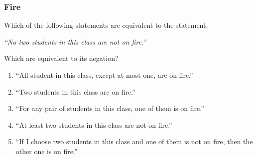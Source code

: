 \documentclass[14pt]{beamer}
\newcommand{\setsize}[1]{\fontsize{#1}{#1}\selectfont} %
\newcommand{\smallerfont}{\setsize{13}} %
\begin{document}
\begin{frame}
\smallerfont
\frametitle{Fire}
Which of the following statements are equivalent to the statement,
	\begin{center}
	\emph{``No two students in this class are not on fire.''}
	\end{center}

Which are equivalent to its negation?  

\vfill

	\begin{enumerate}
		\item ``All student in this class, except at most one, are on fire.''
		\item ``Two students in this class are on fire.''
		\item ``For any pair of students in this class, one of them is on fire.''
		\item ``At least two students in this class are not on fire.''
		\item ``If I choose two students in this class and one of them is not on fire, then the other one is on fire.''
	\end{enumerate}

\vfill

\end{frame}
\end{document}
